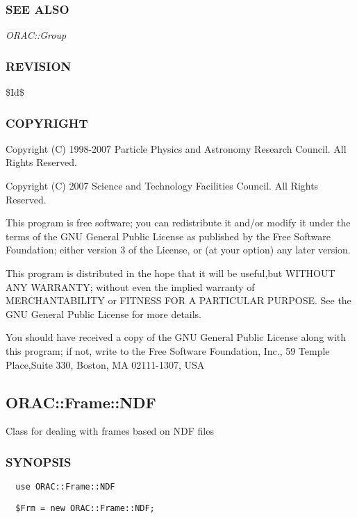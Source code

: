 \subsubsection*{SEE ALSO\label{ORAC::Frame_SEE_ALSO}}


\emph{ORAC::Group}

\subsubsection*{REVISION\label{ORAC::Frame_REVISION}}


\$Id\$

\subsubsection*{COPYRIGHT\label{ORAC::Frame_COPYRIGHT}}


Copyright (C) 1998-2007 Particle Physics and Astronomy Research
Council. All Rights Reserved.



Copyright (C) 2007 Science and Technology Facilities Council.  All
Rights Reserved.



This program is free software; you can redistribute it and/or modify it under
the terms of the GNU General Public License as published by the Free Software
Foundation; either version 3 of the License, or (at your option) any later
version.



This program is distributed in the hope that it will be useful,but WITHOUT ANY
WARRANTY; without even the implied warranty of MERCHANTABILITY or FITNESS FOR A
PARTICULAR PURPOSE. See the GNU General Public License for more details.



You should have received a copy of the GNU General Public License along with
this program; if not, write to the Free Software Foundation, Inc., 59 Temple
Place,Suite 330, Boston, MA  02111-1307, USA

\subsection{ORAC::Frame::NDF\label{ORAC::Frame::NDF}}


Class for dealing with frames based on NDF files

\subsubsection*{SYNOPSIS\label{ORAC::Frame::NDF_SYNOPSIS}}
\begin{verbatim}
  use ORAC::Frame::NDF
\end{verbatim}
\begin{verbatim}
  $Frm = new ORAC::Frame::NDF;
\end{verbatim}
